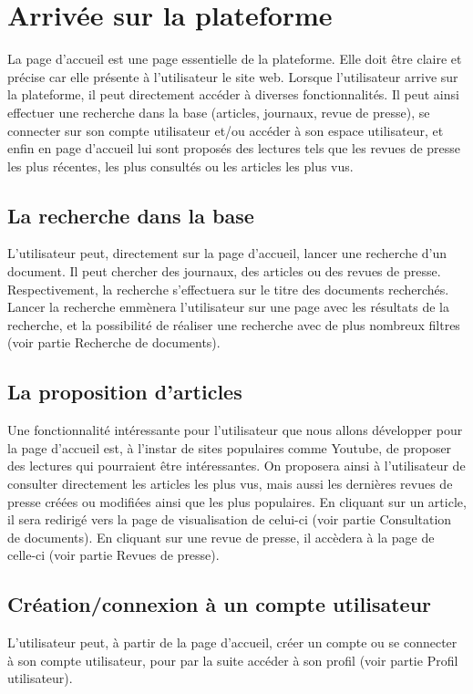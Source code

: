 \section{Arrivée sur la plateforme}
\label{sec:arrivee}

La page d’accueil est une page essentielle de la plateforme. Elle doit être claire et précise car elle présente à l’utilisateur le site web.
Lorsque l’utilisateur arrive sur la plateforme, il peut directement accéder à diverses fonctionnalités. Il peut ainsi effectuer une recherche dans la base (articles, journaux, revue de presse), se connecter sur son compte utilisateur et/ou accéder à son espace utilisateur, et enfin en page d'accueil lui sont proposés des lectures tels que les revues de presse les plus récentes, les plus consultés ou les articles les plus vus.

\subsection{La recherche dans la base}
\label{sec:arrivee_recherche}
L'utilisateur peut, directement sur la page d'accueil, lancer une recherche d'un document. Il peut chercher des journaux, des articles ou des revues de presse. Respectivement, la recherche s'effectuera sur le titre des documents recherchés. Lancer la recherche emmènera l'utilisateur sur une page avec les résultats de la recherche, et la possibilité de réaliser une recherche avec de plus nombreux filtres (voir partie Recherche de documents).

\subsection{La proposition d’articles}
\label{sec:arrivee_article}
Une fonctionnalité intéressante pour l'utilisateur que nous allons développer pour la page d'accueil est, à l'instar de sites populaires comme Youtube, de proposer des lectures qui pourraient être intéressantes. On proposera ainsi à l'utilisateur de consulter directement les articles les plus vus, mais aussi les dernières revues de presse créées ou modifiées ainsi que les plus populaires. En cliquant sur un article, il sera redirigé vers la page de visualisation de celui-ci (voir partie Consultation de documents). En cliquant sur une revue de presse, il accèdera à la page de celle-ci (voir partie Revues de presse).

\subsection{Création/connexion à un compte utilisateur}
\label{sec:arrivee_utilisateur}
L’utilisateur peut, à partir de la page d'accueil, créer un compte ou se connecter à son compte utilisateur, pour par la suite accéder à son profil (voir partie Profil utilisateur).

